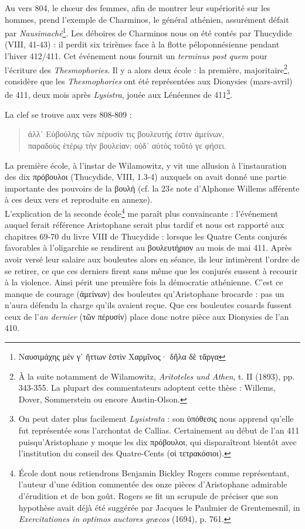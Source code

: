 \documentclass{book}%
\newcommand{\italique}[1]{\textit{#1}}%
\newcommand{\nieme}[1]{#1\italique{e}}%
\newcommand{\note}[1]{\footnote{#1}}
\newcommand{\citComm}[1]{\begin{quote}#1\end{quote}}
\begin{document}
Au vers 804, le chœur des femmes, afin de montrer leur supériorité sur les hommes, prend l'exemple de Charminos, le général athénien, assurément défait par \italique{Nausimaché}\note{Ναυσιμάχης μέν γ᾽ ἥττων ἐστὶν Χαρμῖνος· δῆλα δὲ τἄργα}. Les déboires de Charminos nous on été contés par Thucydide (VIII, 41-43) : il perdit six trirèmes face à la flotte péloponnésienne pendant l'hiver 412/411.
Cet événement nous fournit un \italique{terminus post quem} pour l'écriture des \italique{Thesmophories}.
Il y a alors deux école : la première, majoritaire\note{À la suite notamment de Wilamowitz, \italique{Aritoteles und Athen}, t. II (1893), pp. 343-355. La plupart des commentateurs adoptent cette thèse : Willems, Dover, Sommerstein ou encore Austin-Olson.}, considère que les \italique{Thesmophories} ont été représentées aux Dionysies (mars-avril) de 411, deux mois après \italique{Lysistra}, jouée aux Lénéennes de 411\note{On peut dater plus facilement \italique{Lysistrata} : son ὑπόθεσις  nous apprend qu'elle fut représentée sous l'archontat de Callias. Certainement au début de l'an 411 puisqu'Aristophane y moque les dix πρόβουλοι, qui disparaîtront bientôt avec l'institution du conseil des Quatre-Cents (οἱ τετρακόσιοι).}.

La clef se trouve aux vers 808-809 :

\citComm{ἀλλ᾽ Εὐβούλης τῶν πέρυσίν τις βουλευτής ἐστιν ἀμείνων,\\
παραδοὺς ἑτέρῳ τὴν βουλείαν; οὐδ᾽ αὐτὸς τοῦτό γε φήσει.}

La première école, à l'instar de Wilamowitz, y vit une allusion à l'instauration des dix πρόβουλοι (Thucydide, VIII, 1.3-4) auxquels on avait donné une partie importante des pouvoirs de la βουλή (cf. la \nieme{23} note d'Alphonse Willems afférente à ces deux vers et reproduite en annexe).\\
L'explication de la seconde école\note{École dont nous retiendrons Benjamin Bickley Rogers comme représentant, l'auteur d'une édition commentée des onze pièces d'Aristophane admirable d'érudition et de bon goût. Rogers se fit un scrupule de préciser que son hypothèse avait déjà été suggérée par Jacques le Paulmier de Grentemesnil, in \italique{Exercitationes in optimos auctores græcos} (1694), p. 761.} me paraît plus convaincante : l'événement auquel ferait référence Aristophane serait plus tardif et nous est rapporté aux chapitres 69-70 du livre VIII de Thucydide : lorsque les Quatre Cents conjurés favorables à l'oligarchie se rendirent au βουλευτήριον au mois de mai 411. Après avoir versé leur salaire aux bouleutes alors en séance, ils leur intimèrent l'ordre de se retirer, ce que ces derniers firent sans même que les conjurés eussent à recourir à la violence. Ainsi périt une première fois la démocratie athénienne. C'est ce manque de courage (ἀμείνων) des bouleutes qu'Aristophane brocarde : pas un n'aura défendu la charge qu'ils avaient reçue. Que ces bouleutes couards fussent ceux de l'\italique{an dernier} (τῶν πέρυσίν) place donc notre pièce aux Dionysies de l'an 410.
\end{document}
